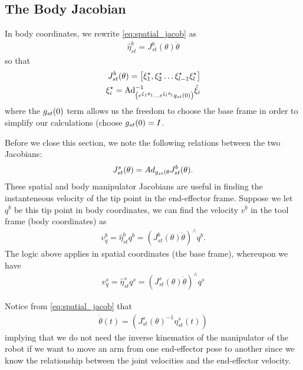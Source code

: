 \subsection{The Body Jacobian}
%
In body coordinates, we rewrite \eqref{eq:spatial_jacob} as 
%
\begin{align}
\hat{\eta}^b_{st} = J^b_{st}(\theta)\dot{\theta}
\label{eq:body_jacob}
\end{align}
%
so that 
%
\begin{subequations}
	\begin{align}
	J_{st}^b(\theta) =  \left[\xi_1^\star, \xi_2^\star  \ldots \xi^\star_{l-1} \xi^\star_{l} \right] \\
	\xi_i^\star = \text{Ad}^{-1}_{\left(e^{\hat{\xi}_1 \theta_1}\ldots e^{\hat{\xi}_{l} \theta_{l}}g_{st}(0)\right)}\hat{\xi}_i
	\end{align}
\end{subequations}
%
where the $g_{st}(0)$ term allows us the freedom to choose the base frame in order to simplify our calculations (\eg choose $g_{st}(0) = I$.

Before we close this section, we note the following relations between the two Jacobians:
%
\begin{align}
	J_{st}^s(\theta) = Ad_{g_{st}(\theta}J_{st}^b(\theta).
\end{align}
%
These spatial and body manipulator Jacobians are useful in finding the instanteneous velocity of the tip point in the end-effector frame. Suppose we let $q^b$ be this tip point in body coordinates, we can find the velocity $v^b$ in the tool frame (body coordinates) as 
%
\begin{align}
	v^b_q = \hat{\eta}_{st}^b q^b = \left(J_{st}^b(\theta) \dot{\theta}\right)^\wedge q^b.
\end{align}
%
The logic above applies in spatial coordinates (\ie the base frame), whereupon we have
%
\begin{align}
v^s_q = \hat{\eta}_{st}^s q^s = \left(J_{st}^s(\theta) \dot{\theta}\right)^\wedge q^s
\end{align}

Notice from \eqref{eq:spatial_jacob} that 
%
\begin{align}
	\dot{\theta}(t) = \left(J_{st}^s(\theta)^{-1} \eta_{st}^s (t) \right)
\end{align}
%
implying that we do not need the inverse kinematics of the manipulator of the robot if we want to move an arm from one end-effector pose to another since we know the relationship between the joint velocities and the end-effector velocity.

